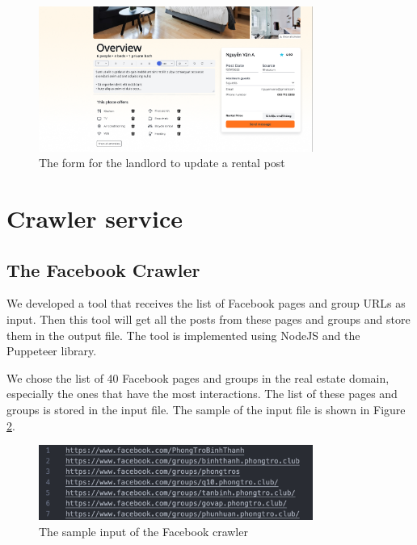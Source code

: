 \begin{figure}[ht]
    \centering
    \includegraphics[width=0.8\textwidth]{Images/Mockup/update_rental.png}
    \caption{The form for the landlord to update a rental post}
    \label{fig:update_rental}
\end{figure}


\section{Crawler service}

\subsection{The Facebook Crawler}
We developed a tool that receives the list of Facebook pages and group URLs as input. Then this tool will get all the posts from these pages and groups and store them in the output file. The tool is implemented using NodeJS and the Puppeteer library.

We chose the list of 40 Facebook pages and groups in the real estate domain, especially the ones that have the most interactions. The list of these pages and groups is stored in the input file. The sample of the input file is shown in Figure \ref{fig:facebook-crawler-input}.

\begin{figure}[ht]
    \centering
    \includegraphics[width=0.8\textwidth]{Images/9.Implementation/facebook_crawler_input.png}
    \caption{The sample input of the Facebook crawler}
    \label{fig:facebook-crawler-input}
\end{figure}

